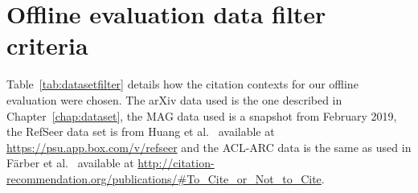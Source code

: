 
\chapter{Offline evaluation data filter criteria}\label{chap:offlineevalfilter}

Table~\ref{tab:datasetfilter} details how the citation contexts for our offline evaluation were chosen. The arXiv data used is the one described in Chapter~\ref{chap:dataset}, the MAG data used is a snapshot from February 2019, the RefSeer data set is from Huang et al.~\cite{Huang2015} available at \url{https://psu.app.box.com/v/refseer} and the ACL-ARC data is the same as used in Färber et al.~\cite{Faerber2018b} available at \url{http://citation-recommendation.org/publications/#To_Cite_or_Not_to_Cite}.

